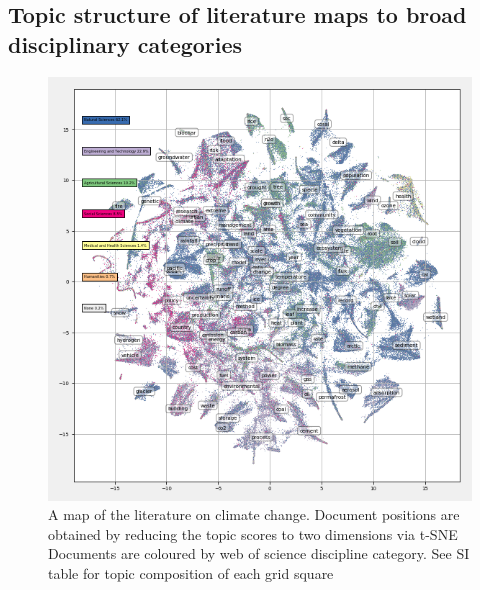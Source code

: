 \documentclass{article}
\begin{document}

\subsection{Topic structure of literature maps to broad disciplinary categories}


\begin{figure}[h!]
	\begin{center}
		\includegraphics[width=1\linewidth]{tsne_results/plots/run_1771_s_0_p200_all_topic_words_oecds.png}
		\caption{A map of the literature on climate change. Document positions are obtained by reducing the topic scores to two dimensions via t-SNE Documents are coloured by web of science discipline category. See SI table for topic composition of each grid square}
		\label{map-oecd}
	\end{center}
\end{figure}
\end{document}
